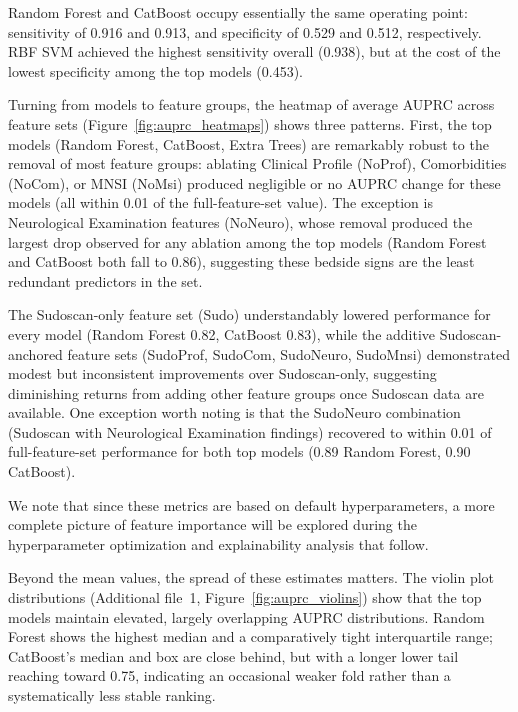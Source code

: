 \documentclass[pdflatex,sn-mathphys-num]{sn-jnl}%
\theoremstyle{thmstyleone}%
\theoremstyle{thmstyletwo}%
\theoremstyle{thmstylethree}%
\begin{document}
Random Forest and CatBoost occupy essentially the same operating point: sensitivity of 0.916 and 0.913, and specificity of 0.529 and 0.512, respectively. RBF SVM achieved the highest sensitivity overall (0.938), but at the cost of the lowest specificity among the top models (0.453).

Turning from models to feature groups, the heatmap of average AUPRC across feature sets (Figure~\ref{fig:auprc_heatmaps}) shows three patterns. First, the top models (Random Forest, CatBoost, Extra Trees) are remarkably robust to the removal of most feature groups: ablating Clinical Profile (NoProf), Comorbidities (NoCom), or MNSI (NoMsi) produced negligible or no AUPRC change for these models (all within 0.01 of the full-feature-set value). The exception is Neurological Examination features (NoNeuro), whose removal produced the largest drop observed for any ablation among the top models (Random Forest and CatBoost both fall to 0.86), suggesting these bedside signs are the least redundant predictors in the set.

The Sudoscan-only feature set (Sudo) understandably lowered performance for every model (Random Forest 0.82, CatBoost 0.83), while the additive Sudoscan-anchored feature sets (SudoProf, SudoCom, SudoNeuro, SudoMnsi) demonstrated modest but inconsistent improvements over Sudoscan-only, suggesting diminishing returns from adding other feature groups once Sudoscan data are available. One exception worth noting is that the SudoNeuro combination (Sudoscan with Neurological Examination findings) recovered to within 0.01 of full-feature-set performance for both top models (0.89 Random Forest, 0.90 CatBoost).

We note that since these metrics are based on default hyperparameters, a more complete picture of feature importance will be explored during the hyperparameter optimization and explainability analysis that follow.

Beyond the mean values, the spread of these estimates matters. The violin plot distributions (Additional file~1, Figure~\ref{fig:auprc_violins}) show that the top models maintain elevated, largely overlapping AUPRC distributions. Random Forest shows the highest median and a comparatively tight interquartile range; CatBoost's median and box are close behind, but with a longer lower tail reaching toward 0.75, indicating an occasional weaker fold rather than a systematically less stable ranking.

\end{document}
